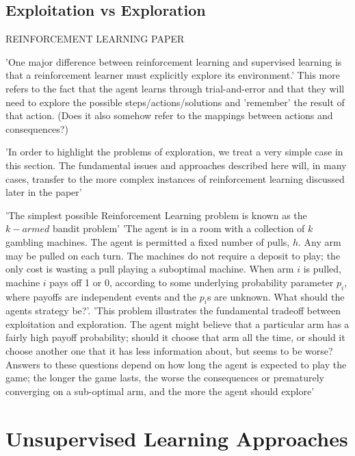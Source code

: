 \subsection{Exploitation vs Exploration} REINFORCEMENT LEARNING PAPER \cite{KaelblingLittmanMoore1996}

'One major difference between reinforcement learning and supervised learning is that a reinforcement learner must explicitly explore its environment.' \cite{KaelblingLittmanMoore1996}
This more refers to the fact that the agent learns through trial-and-error and that they will need to explore the possible steps/actions/solutions and 'remember' the result of that action. (Does it also somehow refer to the mappings between actions and consequences?)

'In order to highlight the problems of exploration, we treat a very simple case in this section. The fundamental issues and approaches described here will, in many cases, transfer to the more complex instances of reinforcement learning discussed later in the paper' \cite{KaelblingLittmanMoore1996}

'The simplest possible Reinforcement Learning problem is known as the $k-armed$ bandit problem' \cite{KaelblingLittmanMoore1996}
'The agent is in a room with a collection of $k$ gambling machines. The agent is permitted a fixed number of pulls, $h$. Any arm may be pulled on each turn. The machines do not require a deposit to play; the only cost is wasting a pull playing a suboptimal machine. When arm $i$ is pulled, machine $i$ pays off 1 or 0, according to some underlying probability parameter $p_i$, where payoffs are independent events and the $p_i$s are unknown. What should the agents strategy be?'\cite{KaelblingLittmanMoore1996}.
'This problem illustrates the fundamental tradeoff between exploitation and exploration. The agent might believe that a particular arm has a fairly high payoff probability; should it choose that arm all the time, or should it choose another one that it has less information about, but seems to be worse? Answers to these questions depend on how long the agent is expected to play the game; the longer the game lasts, the worse the consequences or prematurely converging on a sub-optimal arm, and the more the agent should explore'





\section{Unsupervised Learning Approaches}








